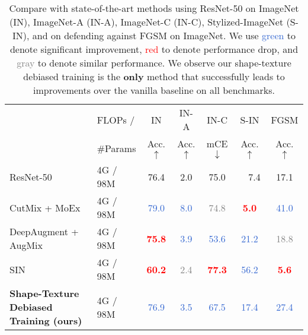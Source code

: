 \documentclass{article} \usepackage{iclr2021_conference,times}
\begin{document}
\begin{table}[t]
\renewcommand\arraystretch{0.8}
\small
\centering
\begin{tabular}{l|Hccccc}
\toprule
         & FLOPs / & \scshape{IN} & \scshape{IN-A} & \scshape{IN-C} & \scshape{S-IN} & \scshape{FGSM} \\ 
& \#Params & {\footnotesize Acc. \color{red}$\mathbf{\uparrow}$} & {\footnotesize Acc. \color{red}$\mathbf{\uparrow}$} & {\footnotesize mCE \color{red}$\mathbf{\downarrow}$} & {\footnotesize Acc. \color{red}$\mathbf{\uparrow}$} & {\footnotesize Acc. \color{red}$\mathbf{\uparrow}$} \\
\midrule
ResNet-50     &  4G / 98M &    76.4 & 2.0      &   75.0         &      ~~7.4             &   17.1   \\
\midrule
CutMix + MoEx~\citep{li2020feature}       & 4G / 98M &  \textcolor{Highlight}{79.0}  &   \textcolor{Highlight}{8.0}      &    \textcolor{gray}{74.8}         &       \textbf{\textcolor{red}{5.0}}             &   \textcolor{Highlight}{41.0}    \\
DeepAugment + AugMix \citep{hendrycks2020many}       & 4G / 98M &  \textbf{\textcolor{red}{75.8}}  &   \textcolor{Highlight}{3.9}      &    \textcolor{Highlight}{53.6}         &       \textcolor{Highlight}{21.2}             &   \textcolor{gray}{18.8}    \\
SIN~\citep{geirhos2018imagenettrained}       & 4G / 98M &  \textbf{\textcolor{red}{60.2}}  &   \textcolor{gray}{2.4}      &    \textbf{\textcolor{red}{77.3}}         &       \textcolor{Highlight}{56.2}             &   \textbf{\textcolor{red}{5.6}}    \\
\textbf{Shape-Texture Debiased Training (ours)}       & 4G / 98M &  \textcolor{Highlight}{76.9}  &   \textcolor{Highlight}{3.5}      &    \textcolor{Highlight}{67.5}         &       \textcolor{Highlight}{17.4}             &   \textcolor{Highlight}{27.4}    \\

\bottomrule
\end{tabular}
\vspace{-0.9em}
\caption{Compare with state-of-the-art methods using ResNet-50 on ImageNet (IN), ImageNet-A (IN-A), ImageNet-C (IN-C), Stylized-ImageNet (S-IN), and on defending against FGSM on ImageNet. We use \textcolor{Highlight}{green} to denote significant improvement, \textcolor{red}{red} to denote performance drop, and \textcolor{gray}{gray} to denote similar performance. We observe our shape-texture debiased training is the \textbf{only} method that successfully leads to improvements over the vanilla baseline on all benchmarks.}
\vspace{-0.5em}
\label{tab:compare_sota}
\end{table}
\end{document}
